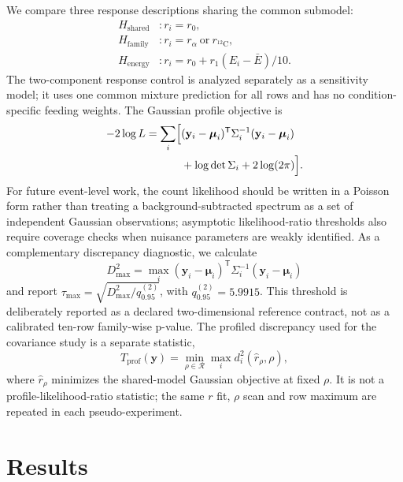 \documentclass[pdflatex,iicol,sn-mathphys-num]{sn-jnl}
\begin{document}
We compare three response descriptions sharing the common submodel:
\begin{align}
H_{\mathrm{shared}} &: r_i=r_0,\\
H_{\mathrm{family}} &: r_i=r_\alpha\ \text{or}\ r_{^{12}\mathrm C},\\
H_{\mathrm{energy}} &: r_i=r_0+r_1(E_i-\bar E)/10.
\end{align}
The two-component response control is analyzed separately as a sensitivity model; it
uses one common mixture prediction for all rows and has no condition-specific feeding
weights.
The Gaussian profile objective is
\begin{equation}
\begin{aligned}
-2\log L=\sum_i\Bigl[&
(\mathbf y_i-\boldsymbol{\mu}_i)^\mathsf{T}\Sigma_i^{-1}
(\mathbf y_i-\boldsymbol{\mu}_i)\\
&+\log\det\Sigma_i+2\log(2\pi)\Bigr].
\end{aligned}
\end{equation}
For future event-level work, the count likelihood should be written in a
Poisson form rather than treating a background-subtracted spectrum as a set of
independent Gaussian observations; asymptotic likelihood-ratio thresholds also
require coverage checks when nuisance parameters are weakly identified.
As a complementary discrepancy diagnostic, we calculate
\begin{equation}
D_{\max}^2=\max_i
(\mathbf y_i-\boldsymbol{\mu}_i)^\mathsf{T}\Sigma_i^{-1}
(\mathbf y_i-\boldsymbol{\mu}_i)
\end{equation}
and report \(\tau_{\max}=\sqrt{D_{\max}^2/q_{0.95}^{(2)}}\), with
\(q_{0.95}^{(2)}=5.9915\). This threshold is deliberately reported as a declared two-dimensional reference contract, not as a calibrated ten-row family-wise p-value.
The profiled discrepancy used for the covariance study is a separate statistic,
\begin{equation}
T_{\mathrm{prof}}(\mathbf y)=
\min_{\rho\in\mathcal R}
\max_i d_i^2\!\left(\widehat r_\rho,\rho\right),
\end{equation}
where \(\widehat r_\rho\) minimizes the shared-model Gaussian objective at fixed
\(\rho\). It is not a profile-likelihood-ratio statistic; the same \(r\) fit,
\(\rho\) scan and row maximum are repeated in each pseudo-experiment.

\section{Results}
\end{document}
